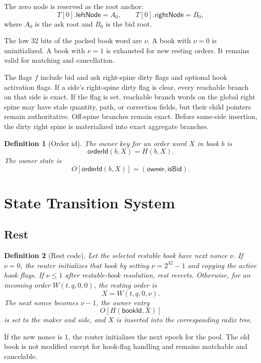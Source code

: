 \documentclass[11pt]{article}
\newtheorem{definition}{Definition}
\begin{document}
The zero node is reserved as the root anchor:
\[
  T[0].\mathsf{leftNode}=A_0,\qquad T[0].\mathsf{rightNode}=B_0,
\]
where \(A_0\) is the ask root and \(B_0\) is the bid root.

The low 32 bits of the packed book word are \(\nu\).  A book with
\(\nu=0\) is uninitialized.  A book with \(\nu=1\) is exhausted for new
resting orders.  It remains valid for matching and cancellation.

The flags \(f\) include bid and ask right-spine dirty flags and optional
hook activation flags.  If a side's right-spine dirty flag is clear,
every reachable branch on that side is exact.  If the flag is set,
reachable branch words on the global right spine may have stale
quantity, path, or correction fields, but their child pointers remain
authoritative.  Off-spine branches remain exact.  Before same-side
insertion, the dirty right spine is materialized into exact aggregate
branches.

\begin{definition}[Order id]
The owner key for an order word \(X\) in book \(b\) is
\[
  \mathsf{orderId}(b,X)=H(b,X).
\]
The owner state is
\[
  O[\mathsf{orderId}(b,X)]=(\mathsf{owner},\mathsf{isBid}).
\]
\end{definition}

\section{State Transition System}

\subsection{Rest}

\begin{definition}[Rest code]
Let the selected restable book have next nonce \(\nu\).  If \(\nu=0\),
the router initializes that book by setting \(\nu=2^{32}-1\) and copying
the active hook flags.  If \(\nu\le 1\) after restable-book resolution,
rest reverts.  Otherwise, for an incoming order \(W(t,q,0,0)\), the
resting order is
\[
  X=W(t,q,0,\nu).
\]
The next nonce becomes \(\nu-1\), the owner entry
\[
  O[H(\mathsf{bookId},X)]
\]
is set to the maker and side, and \(X\) is inserted into the
corresponding radix tree.
\end{definition}

If the new nonce is \(1\), the router initializes the next epoch for the
pool.  The old book is not modified except for hook-flag handling and
remains matchable and cancelable.
\end{document}
